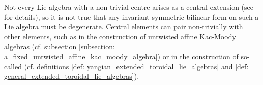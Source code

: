 \begin{remark}
            Not every Lie algebra with a non-trivial centre arises as a central extension (see \cite[Section 1]{garland_arithmetics_of_loop_groups} for details), so it is not true that any invariant symmetric bilinear form on such a Lie algebra must be degenerate. Central elements can pair non-trivially with other elements, such as in the construction of untwisted affine Kac-Moody algebras (cf. subsection \ref{subsection: a_fixed_untwisted_affine_kac_moody_algebra}) or in the construction of so-called  (cf. definitions \ref{def: yangian_extended_toroidal_lie_algebras} and \ref{def: general_extended_toroidal_lie_algebras}).
        \end{remark}